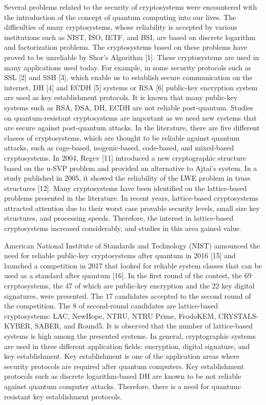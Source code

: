 \documentclass[a4paper,fleqn]{cas-dc}
\begin{document}
	Several problems related to the security of cryptosystems were encountered with the introduction of the concept of quantum computing into our lives. The difficulties of many cryptosystems, whose reliability is accepted by various institutions such as NIST, ISO, IETF, and BSI, are based on discrete logarithm and factorization problems. The cryptosystems based on these problems have proved to be unreliable by Shor's Algorithm [1]. These cryptosystems are used in many applications used today. For example, in some security protocols such as SSL [2] and SSH [3], which enable us to establish secure communication on the internet, DH [4] and ECDH [5] systems or RSA [6] public-key encryption system are used as key establishment protocols. It is known that many public-key systems such as RSA, DSA, DH, ECDH are not reliable post-quantum. Studies on quantum-resistant cryptosystems are important as we need new systems that are secure against post-quantum attacks. In the literature, there are five different classes of cryptosystems, which are thought to be reliable against quantum attacks, such as cage-based, isogenic-based, code-based, and mixed-based cryptosystems. In 2004, Regev [11] introduced a new cryptographic structure based on the u-SVP problem and provided an alternative to Ajtai's system. In a study published in 2005, it showed the reliability of the LWE problem in truss structures [12]. Many cryptosystems have been identified on the lattice-based problems presented in the literature. In recent years, lattice-based cryptosystems attracted attention due to their worst case provable security levels, small size key structures, and processing speeds. Therefore, the interest in lattice-based cryptosystems increased considerably, and studies in this area gained value. 

	American National Institute of Standards and Technology (NIST) announced the need for reliable public-key cryptosystems after quantum in 2016 [15] and launched a competition in 2017 that looked for reliable system classes that can be used as a standard after quantum [16]. In the first round of the contest, the 69 cryptosystems, the 47 of which are public-key encryption and the 22 key digital signatures, were presented. The 17 candidates accepted to the second round of the competition. The 8 of second-round candidates are lattice-based cryptosystems: LAC, NewHope, NTRU, NTRU Prime, FrodoKEM, CRYSTALS-KYBER, SABER, and Round5. It is observed that the number of lattice-based systems is high among the presented systems. In general, cryptographic systems are used in three different application fields: encryption, digital signature, and key establishment. Key establishment is one of the application areas where security protocols are required after quantum computers. Key establishment protocols such as discrete logarithm-based DH are known to be not reliable against quantum computer attacks. Therefore, there is a need for quantum-resistant key establishment protocols.
\end{document}

